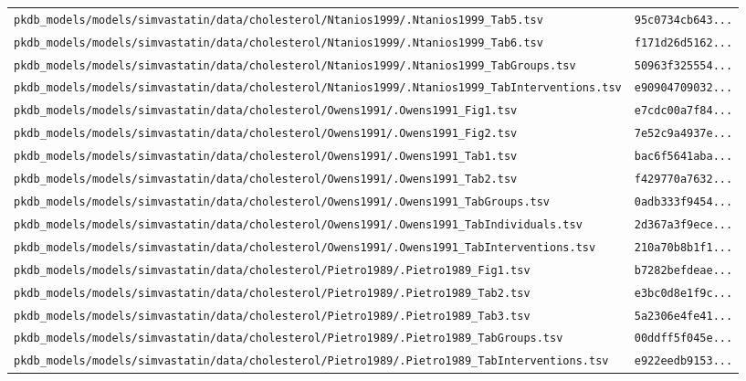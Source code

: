 \documentclass{article}
\begin{document}
\begin{longtable}{ll}
\texttt{pkdb\_models/models/simvastatin/data/cholesterol/Ntanios1999/.Ntanios1999\_Tab5.tsv} & \texttt{95c0734cb643...} \\
\texttt{pkdb\_models/models/simvastatin/data/cholesterol/Ntanios1999/.Ntanios1999\_Tab6.tsv} & \texttt{f171d26d5162...} \\
\texttt{pkdb\_models/models/simvastatin/data/cholesterol/Ntanios1999/.Ntanios1999\_TabGroups.tsv} & \texttt{50963f325554...} \\
\texttt{pkdb\_models/models/simvastatin/data/cholesterol/Ntanios1999/.Ntanios1999\_TabInterventions.tsv} & \texttt{e90904709032...} \\
\texttt{pkdb\_models/models/simvastatin/data/cholesterol/Owens1991/.Owens1991\_Fig1.tsv} & \texttt{e7cdc00a7f84...} \\
\texttt{pkdb\_models/models/simvastatin/data/cholesterol/Owens1991/.Owens1991\_Fig2.tsv} & \texttt{7e52c9a4937e...} \\
\texttt{pkdb\_models/models/simvastatin/data/cholesterol/Owens1991/.Owens1991\_Tab1.tsv} & \texttt{bac6f5641aba...} \\
\texttt{pkdb\_models/models/simvastatin/data/cholesterol/Owens1991/.Owens1991\_Tab2.tsv} & \texttt{f429770a7632...} \\
\texttt{pkdb\_models/models/simvastatin/data/cholesterol/Owens1991/.Owens1991\_TabGroups.tsv} & \texttt{0adb333f9454...} \\
\texttt{pkdb\_models/models/simvastatin/data/cholesterol/Owens1991/.Owens1991\_TabIndividuals.tsv} & \texttt{2d367a3f9ece...} \\
\texttt{pkdb\_models/models/simvastatin/data/cholesterol/Owens1991/.Owens1991\_TabInterventions.tsv} & \texttt{210a70b8b1f1...} \\
\texttt{pkdb\_models/models/simvastatin/data/cholesterol/Pietro1989/.Pietro1989\_Fig1.tsv} & \texttt{b7282befdeae...} \\
\texttt{pkdb\_models/models/simvastatin/data/cholesterol/Pietro1989/.Pietro1989\_Tab2.tsv} & \texttt{e3bc0d8e1f9c...} \\
\texttt{pkdb\_models/models/simvastatin/data/cholesterol/Pietro1989/.Pietro1989\_Tab3.tsv} & \texttt{5a2306e4fe41...} \\
\texttt{pkdb\_models/models/simvastatin/data/cholesterol/Pietro1989/.Pietro1989\_TabGroups.tsv} & \texttt{00ddff5f045e...} \\
\texttt{pkdb\_models/models/simvastatin/data/cholesterol/Pietro1989/.Pietro1989\_TabInterventions.tsv} & \texttt{e922eedb9153...} \\

\end{longtable}
\end{document}
